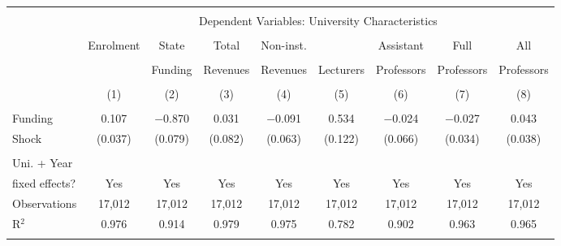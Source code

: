 
\begin{tabular}{@{\extracolsep{5pt}}lcccccccc} 
\\[-1.8ex]\hline 
\hline \\[-1.8ex] 
 & \multicolumn{8}{c}{Dependent Variables: University Characteristics} \\ 
\cline{2-9} 
\\[-1.8ex] & Enrolment & State & Total & Non-inst. &   & Assistant & Full & All \\ 
\\[-1.8ex] &           & Funding & Revenues & Revenues & Lecturers & Professors & Professors & Professors \\ 
\\[-1.8ex] & (1) & (2) & (3) & (4) & (5) & (6) & (7) & (8)\\ 
\hline \\[-1.8ex] 
 Funding & 0.107 & $-$0.870 & 0.031 & $-$0.091 & 0.534 & $-$0.024 & $-$0.027 & 0.043 \\ 
 Shock   & (0.037) & (0.079) & (0.082) & (0.063) & (0.122) & (0.066) & (0.034) & (0.038) \\ 
\hline \\[-1.8ex] 
 Uni. + Year \\
 fixed effects? & Yes & Yes & Yes & Yes & Yes & Yes & Yes & Yes \\
Observations & 17,012 & 17,012 & 17,012 & 17,012 & 17,012 & 17,012 & 17,012 & 17,012 \\ 
R$^{2}$ & 0.976 & 0.914 & 0.979 & 0.975 & 0.782 & 0.902 & 0.963 & 0.965 \\ 
\hline 
\hline \\[-1.8ex] 
\end{tabular} 
